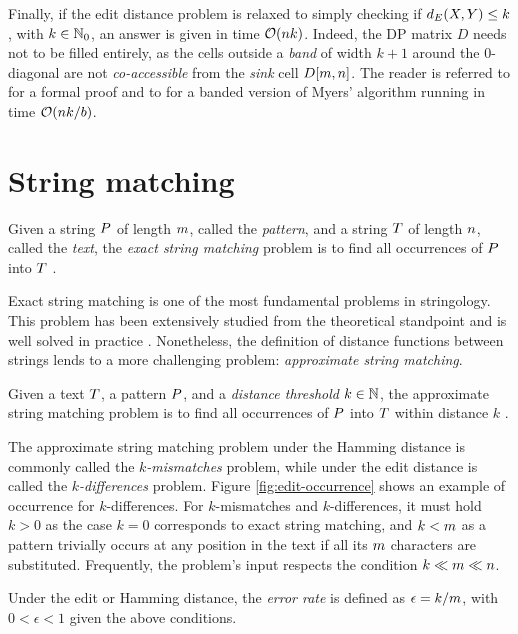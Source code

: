 Finally, if the edit distance problem is relaxed to simply checking if $d_E(X,Y) \leq k$, with $k \in \mathbb {N}_0$, an answer is given in time $\mathcal{O}(n k)$.
Indeed, the DP matrix $D$ needs not to be filled entirely, as the cells outside a \emph{band} of width $k+1$ around the $0$-diagonal are not \emph{co-accessible} from the \emph{sink} cell $D[m,n]$.
The reader is referred to \citep{Siragusa2013b} for a formal proof and to \citep{Weese2012} for a banded version of Myers' algorithm running in time $\mathcal{O}(n k/b)$.


\section{String matching}

\begin{definition}
Given a string $P$ of length $m$, called the \emph{pattern}, and a string $T$ of length $n$, called the \emph{text}, the \emph{exact string matching} problem is to find all occurrences of $P$ into $T$ \citep{Gusfield1997}.
\end{definition}

Exact string matching is one of the most fundamental problems in stringology.
This problem has been extensively studied from the theoretical standpoint and is well solved in practice \citep{Faro2013}.
Nonetheless, the definition of distance functions between strings lends to a more challenging problem: \emph{approximate string matching}.

\begin{definition}
Given a text $T$, a pattern $P$, and a \emph{distance threshold} $k \in \mathbb {N}$, the approximate string matching problem is to find all occurrences of $P$ into $T$ within distance $k$ \citep{Galil1988}.
\end{definition}

The approximate string matching problem under the Hamming distance is commonly called the \emph{$k$-mismatches} problem, while under the edit distance is called the \emph{$k$-differences} problem.
Figure \ref{fig:edit-occurrence} shows an example of occurrence for $k$-differences.
For $k$-mismatches and $k$-differences, it must hold $k > 0$ as the case $k = 0$ corresponds to exact string matching, and $k < m$ as a pattern trivially occurs at any position in the text if all its $m$ characters are substituted.
Frequently, the problem's input respects the condition $k \ll m \ll n$.
\begin{definition}
Under the edit or Hamming distance, the \emph{error rate} is defined as $\epsilon = k/m$, with $0 < \epsilon < 1$ given the above conditions.
\end{definition}

